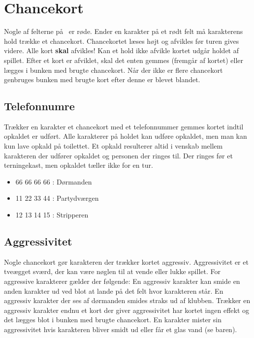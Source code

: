 \section{Chancekort}
Nogle af felterne på \LeClub\ er røde. Ender en karakter på et rødt felt må karakterens hold trække et chancekort. Chancekortet læses højt og afvikles før turen gives videre. Alle kort \textbf{skal} afvikles! Kan et hold ikke afvikle kortet udgår holdet af spillet. Efter et kort er afviklet, skal det enten gemmes (fremgår af kortet) eller lægges i bunken med brugte chancekort. Når der ikke er flere chancekort genbruges bunken med brugte kort efter denne er blevet blandet.
\subsection{Telefonnumre}
Trækker en karakter et chancekort med et telefonnummer gemmes kortet indtil opkaldet er udført. Alle karakterer på holdet kan udføre opkaldet, men man kan kun lave opkald på toilettet. Et opkald resulterer altid i venskab mellem karakteren der udfører opkaldet og personen der ringes til. Der ringes før et terningekast, men opkaldet tæller ikke for en tur.
\begin{itemize}
\item[\faPhone] 66 66 66 66 : Dørmanden
\item[\faPhone] 11 22 33 44 : Partydværgen
\item[\faPhone] 12 13 14 15 : Stripperen
\end{itemize}
\subsection{Aggressivitet}
Nogle chancekort gør karakteren der trækker kortet aggressiv. Aggressivitet er et tveægget sværd, der kan være nøglen til at vende eller lukke spillet. For aggressive karakterer gælder der følgende: En aggressiv karakter kan smide en anden karakter ud ved blot at lande på det felt hvor karakteren står. En aggressiv karakter der ses af dørmanden smides straks ud af klubben. Trækker en aggressiv karakter endnu et kort der giver aggressivitet har kortet ingen effekt og det lægges blot i bunken med brugte chancekort. En karakter mister sin aggressivitet hvis karakteren bliver smidt ud eller får et glas vand (se baren).


